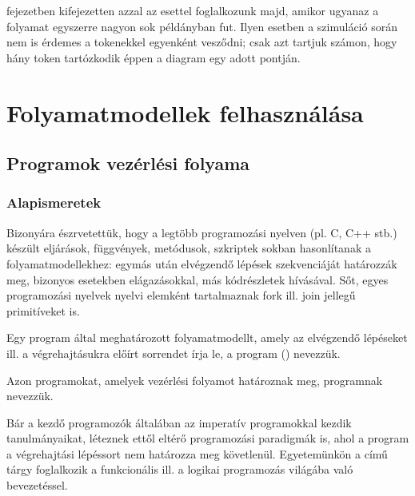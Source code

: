  fejezetben kifejezetten azzal az esettel foglalkozunk majd, amikor ugyanaz a folyamat egyszerre nagyon sok példányban fut. Ilyen esetben a szimuláció során nem is érdemes a tokenekkel egyenként vesződni; csak azt tartjuk számon, hogy hány token tartózkodik éppen a diagram egy adott pontján.






\section{Folyamatmodellek felhasználása}

\subsection{Programok vezérlési folyama}

\subsubsection{Alapismeretek}
Bizonyára észrvetettük, hogy a legtöbb programozási nyelven (pl. C, C++ stb.) készült eljárások, függvények, metódusok, szkriptek sokban hasonlítanak a folyamatmodellekhez: egymás után elvégzendő lépések szekvenciáját határozzák meg, bizonyos esetekben elágazásokkal, más kódrészletek hívásával. Sőt, egyes programozási nyelvek nyelvi elemként tartalmaznak fork ill. join jellegű primitíveket is.  

\begin{definicio}
Egy program által meghatározott folyamatmodellt, amely az elvégzendő lépéseket ill. a végrehajtásukra előírt sorrendet írja le, a program  () nevezzük. 
\end{definicio}

\begin{definicio}
Azon programokat, amelyek vezérlési folyamot határoznak meg,  programnak nevezzük.  
\end{definicio}
\begin{megjegyzes}
	Bár a kezdő programozók általában az imperatív programokkal kezdik tanulmányaikat, léteznek ettől eltérő programozási paradigmák is, ahol a program a végrehajtási lépéssort nem határozza meg követlenül. Egyetemünkön a \deklapo című tárgy foglalkozik a funkcionális ill. a logikai programozás világába való bevezetéssel.
\end{megjegyzes}


